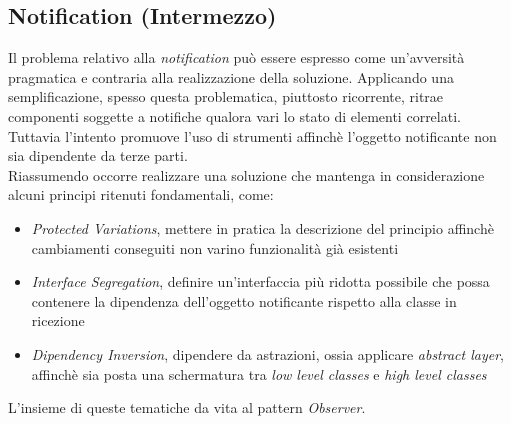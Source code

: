 \documentclass{article}
\begin{document}
\subsection*{Notification (Intermezzo)}
\large
Il problema relativo alla \textit{notification} può essere espresso come un'avversità pragmatica e contraria alla realizzazione della soluzione. Applicando una semplificazione, spesso questa problematica, piuttosto ricorrente, ritrae componenti soggette a notifiche qualora vari lo stato di elementi correlati. Tuttavia l'intento promuove l'uso di strumenti affinchè l'oggetto notificante non sia dipendente da terze parti.\vspace*{14pt}\\
Riassumendo occorre realizzare una soluzione che mantenga in considerazione alcuni principi ritenuti fondamentali, come:
\begin{itemize}[label={-}]
    \itemsep0em
    \item \textit{Protected Variations}, mettere in pratica la descrizione del principio affinchè cambiamenti conseguiti non varino funzionalità già esistenti
    \item \textit{Interface Segregation}, definire un'interfaccia più ridotta possibile che possa contenere la dipendenza dell'oggetto notificante rispetto alla classe in ricezione
    \item \textit{Dipendency Inversion}, dipendere da astrazioni, ossia applicare \textit{abstract layer}, affinchè sia posta una schermatura tra \textit{low level classes} e \textit{high level classes}
\end{itemize}
L'insieme di queste tematiche da vita al pattern \textit{Observer}.
\end{document}
